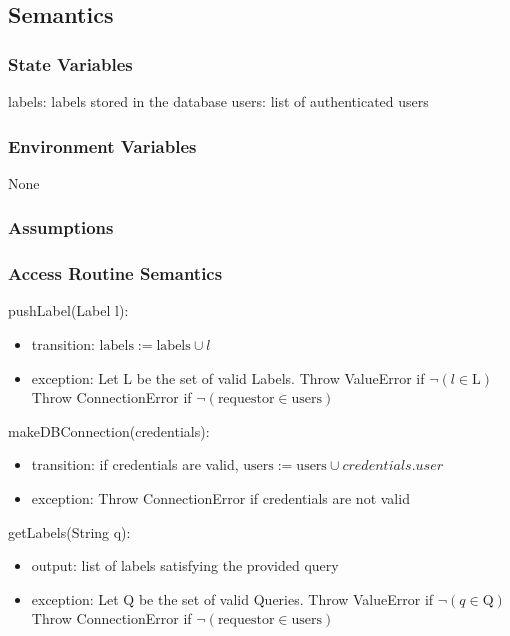 \documentclass[12pt, titlepage]{article}
\begin{document}
  \subsection{Semantics}
  
  \subsubsection{State Variables}
  
  labels: labels stored in the database
  users: list of authenticated users
  
  \subsubsection{Environment Variables}
  
  None
  
  \subsubsection{Assumptions}
  
  
  \subsubsection{Access Routine Semantics}
  
  \noindent pushLabel(Label l):
  \begin{itemize}
  \item transition: $\text{labels} := \text{labels} \cup l $
  \item exception: Let L be the set of valid Labels. Throw ValueError if $\neg (l \in \text{L})$\\
  Throw ConnectionError if $\neg (\text{requestor} \in \text{users})$
  \end{itemize}

  \noindent makeDBConnection(credentials):
  \begin{itemize}
  \item transition: if credentials are valid, $\text{users} := \text{users} \cup credentials.user $
  \item exception: Throw ConnectionError if credentials are not valid
  \end{itemize}

  \noindent getLabels(String q):
  \begin{itemize}
  \item output: list of labels satisfying the provided query
  \item exception: Let Q be the set of valid Queries. Throw ValueError if $\neg (q \in \text{Q})$\\
  Throw ConnectionError if $\neg (\text{requestor} \in \text{users})$

  \end{itemize}
  
\end{document}
